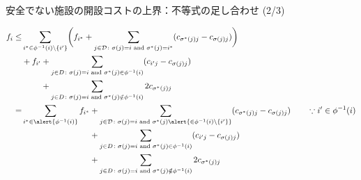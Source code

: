 \begin{frame}{\alert{安全でない}施設の開設コストの上界：不等式の足し合わせ (2/3)}

	\begin{align*}
		f_{i} \le & \sum_{i^* \in \phi^{-1}(i) \setminus \{i'\}} \biggl(f_{i^*} + \sum_{j \in \DemandSet \colon \sigma(j) = i \text{ and } \sigma^*(j) = i^{*}} (c_{\sigma^*(j)j} - c_{\sigma(j)j})\biggr)                                                                                                                  \\
		          & + \begin{aligned}[t]
			              f_{i'}
			               & + \sum_{j \in D \colon \sigma(j) = i \text{ and } \sigma^*(j) \in \phi^{-1}(i)} (c_{i'j} - c_{\sigma(j)j}) \\
			               & + \sum_{j \in D \colon \sigma(j) = i \text{ and } \sigma^*(j) \notin \phi^{-1}(i)} 2c_{\sigma^*(j)j}
		              \end{aligned}                                                                                                                            \\
		=         & \sum_{i^* \in \alert{\phi^{-1}(i)}} f_{i^*} \begin{aligned}[t]
			                                                         & + \sum_{j \in \DemandSet \colon \sigma(j) = i \text{ and } \sigma^*(j) \alert{\in \phi^{-1}(i) \setminus \{i'\}}} (c_{\sigma^*(j)j} - c_{\sigma(j)j}) \qquad \because{i' \in \phi^{-1}(i)} \\
			                                                         & + \sum_{j \in D \colon \sigma(j) = i \text{ and } \sigma^*(j) \in \phi^{-1}(i)} (c_{i'j} - c_{\sigma(j)j})                                                                                 \\
			                                                         & + \sum_{j \in D \colon \sigma(j) = i \text{ and } \sigma^*(j) \notin \phi^{-1}(i)} 2c_{\sigma^*(j)j}
		                                                        \end{aligned} \\
	\end{align*}

\end{frame}


